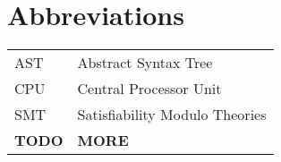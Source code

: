 \chapter*{Abbreviations}


\noindent
\begin{longtable}{@{}p{}p{}@{}}
AST & Abstract Syntax Tree \\
CPU & Central Processor Unit \\
SMT & Satisfiability Modulo Theories \\
\textbf{TODO} & \textbf{MORE}
\end{longtable}

